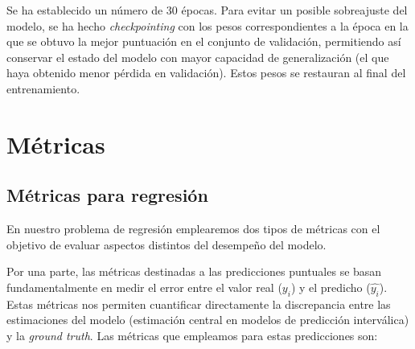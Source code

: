 Se ha establecido un número de 30 épocas. 
Para evitar un posible sobreajuste del modelo, se ha hecho \textit{checkpointing} con los pesos
correspondientes a la época en la que se obtuvo la mejor puntuación en el conjunto de validación, permitiendo 
así conservar el estado del modelo con mayor capacidad de generalización (el que haya obtenido menor pérdida
en validación). Estos pesos se restauran al final del entrenamiento.


\section{Métricas}

\subsection{Métricas para regresión}

En nuestro problema de regresión emplearemos dos tipos de métricas con el objetivo de evaluar aspectos 
distintos del desempeño del modelo.

Por una parte, las métricas destinadas a las predicciones puntuales se basan fundamentalmente en medir el 
error entre el valor real ($y_i$) y el predicho ($\hat{y_i}$). Estas métricas nos permiten cuantificar 
directamente la discrepancia entre las estimaciones del modelo (estimación central en modelos de predicción
interválica) y la \textit{ground truth}. Las métricas que empleamos para estas predicciones son:

